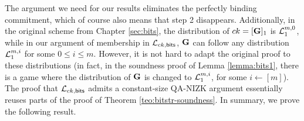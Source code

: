 The argument we need for our results eliminates the perfectly binding commitment, which of course also means that step 2 disappears. Additionally, in the original scheme from Chapter \ref{sec:bits}, the distribution of $ck=[\mathbf{{G}}]_1$ is $\mathcal{L}_1^{m,0}$, while in our argument of membership in 
$\mathcal{L}_{ck,\mathsf{bits}}$, $\mathbf{{G}}$ can follow any distribution $\mathcal{L}_1^{m,i}$ for some $0 \leq i \leq m$. 
However, it is not hard to adapt the original proof to these distributions (in fact, in the soundness proof of 
Lemma \ref{lemma:bits1}, there is a game where the distribution of $\mathbf{{G}}$ is changed to $\mathcal{L}_1^{m,i}$, for some $i \gets [m]$). The proof that $\mathcal{L}_{ck,\mathsf{bits}}$ admits a constant-size QA-NIZK argument essentially reuses parts of the proof of Theorem \ref{teo:bitstr-soundness}.  In summary, we prove the following result. 

